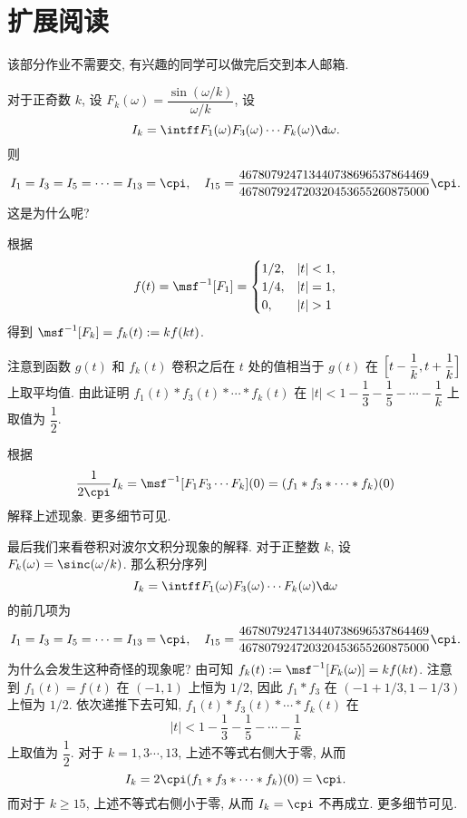 \section*{扩展阅读}
该部分作业不需要交, 有兴趣的同学可以做完后交到本人邮箱.
\begin{exercise}
对于正奇数 $k$, 设 $F_k(\omega)=\dfrac{\sin(\omega/k)}{\omega/k}$, 设
\[I_k=\intff F_1(\omega)F_3(\omega)\cdots F_k(\omega)\d\omega.\]
则
\[I_1=I_3=I_5=\cdots=I_{13}=\cpi,\quad
I_{15}=\frac{467 807 924 713 440 738 696 537 864 469}{467 807 924 720 320 453 655 260 875 000}\cpi.\]
这是为什么呢?

  根据 
\[f(t)=\msf^{-1}[F_1]=\begin{cases}
  1/2, & |t|<1,\\
  1/4, & |t|=1,\\
  0, & |t|>1
\end{cases}\]
得到 $\msf^{-1}[F_k]=f_k(t):=kf(kt)$.

  注意到函数 $g(t)$ 和 $f_k(t)$ 卷积之后在 $t$ 处的值相当于 $g(t)$ 在 $\Bigl[t-\dfrac1k,t+\dfrac1k\Bigr]$ 上取平均值.
由此证明 $f_1(t)\ast f_3(t)\ast \cdots\ast f_k(t)$ 在 $|t|<1-\dfrac13-\dfrac15-\cdots-\dfrac1k$ 上取值为 $\dfrac12$.

  根据
\[\frac1{2\cpi}I_k=\msf^{-1}[F_1F_3\cdots F_k](0)=(f_1\ast f_3\ast\cdots\ast f_k)(0)\]
解释上述现象.
更多细节可见\cite{3B1Bb}.
\end{exercise}



最后我们来看卷积对波尔文积分现象的解释.
对于正整数 $k$, 设 $F_k(\omega)=\sinc(\omega/k)$.
那么积分序列
\[
  I_k=\intff F_1(\omega)F_3(\omega)\cdots F_k(\omega)\d\omega
\]
的前几项为
\[
  I_1=I_3=I_5=\cdots=I_{13}=\cpi,\quad
  I_{15}=\frac{467 807 924 713 440 738 696 537 864 469}{467 807 924 720 320 453 655 260 875 000}\cpi.
\]
为什么会发生这种奇怪的现象呢?
由\thmFSim 可知 $f_k(t):=\msf^{-1}[F_k(\omega)]=kf(kt)$.
注意到 $f_1(t)=f(t)$ 在 $(-1,1)$ 上恒为 $1/2$, 因此 $f_1\ast f_3$ 在 $(-1+1/3,1-1/3)$ 上恒为 $1/2$.
依次递推下去可知, $f_1(t)\ast f_3(t)\ast \cdots\ast f_k(t)$ 在
\[
  |t|<1-\dfrac13-\dfrac15-\cdots-\dfrac1k
\]
上取值为 $\dfrac12$.
对于 $k=1,3\cdots,13$, 上述不等式右侧大于零, 从而
\[
  I_k=2\cpi (f_1\ast f_3\ast \cdots\ast f_k)(0)=\cpi.
\]
而对于 $k\ge 15$, 上述不等式右侧小于零, 从而 $I_k=\cpi$ 不再成立.
更多细节可见\cite{3B1Bb}.


